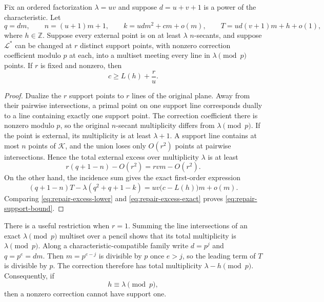 \begin{lemma}
\label{lem:repair-support}
Fix an ordered factorization \(\lambda=uv\) and suppose
\(d=u+v+1\) is a power of the characteristic.  Let
\[
 q=dm,\qquad n=(u+1)m+1,\qquad
 k=udm^2+cm+o(m),\qquad
 T=ud(v+1)m+h+o(1),
\]
where \(h\in\mathbb Z\).  Suppose every external point is on at least
\(\lambda\) \(n\)-secants, and suppose \(\mathcal L^*\) can be changed at
\(r\) distinct support points, with nonzero correction coefficient modulo
\(p\) at each, into a multiset meeting every line in \(\lambda\pmod p\)
points.  If \(r\) is fixed and nonzero, then
\begin{equation}\label{eq:repair-support-bound}
 c\ge L(h)+\frac ru.
\end{equation}
\end{lemma}

\begin{proof}
Dualize the \(r\) support points to \(r\) lines of the original plane.
Away from their pairwise intersections, a primal point on one support line
corresponds dually to a line containing exactly one support point.  The
correction coefficient there is nonzero modulo \(p\), so the original
\(n\)-secant multiplicity differs from \(\lambda\pmod p\).  If the point is
external, its multiplicity is at least \(\lambda+1\).  A support line contains
at most \(n\) points of \(\mathcal K\), and the union loses only
\(O(r^2)\) points at pairwise intersections.  Hence the total external excess
over multiplicity \(\lambda\) is at least
\begin{equation}\label{eq:repair-excess-lower}
 r(q+1-n)-O(r^2)=rvm-O(r^2).
\end{equation}
On the other hand, the incidence sum gives the exact first-order expression
\begin{equation}\label{eq:repair-excess-exact}
 (q+1-n)T-\lambda(q^2+q+1-k)
 =uv\bigl(c-L(h)\bigr)m+o(m).
\end{equation}
Comparing \eqref{eq:repair-excess-lower} and
\eqref{eq:repair-excess-exact} proves \eqref{eq:repair-support-bound}.
\end{proof}

There is a useful restriction when \(r=1\).  Summing the line intersections
of an exact \(\lambda\pmod p\) multiset over a pencil shows that its total
multiplicity is \(\lambda\pmod p\).  Along a characteristic-compatible
family write \(d=p^j\) and \(q=p^e=dm\).  Then \(m=p^{e-j}\) is divisible
by \(p\) once \(e>j\), so the leading term of \(T\) is divisible by \(p\).
The correction therefore has total multiplicity
\(\lambda-h\pmod p\).  Consequently, if
\begin{equation}\label{eq:support-one-obstruction}
 h\equiv\lambda\pmod p,
\end{equation}
then a nonzero correction cannot have support one.


